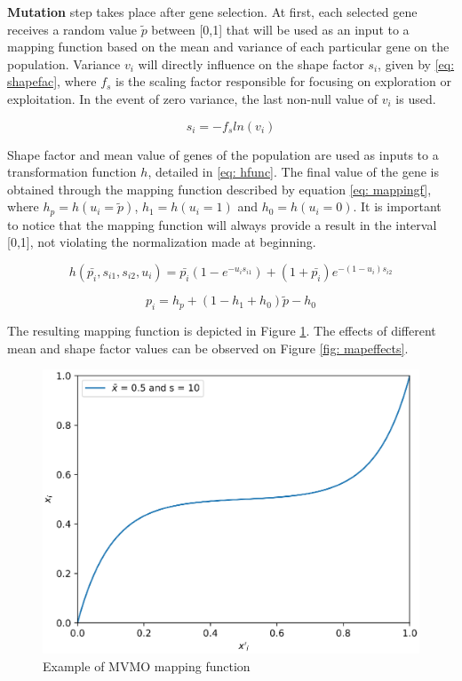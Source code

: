 \textbf{Mutation} step takes place after gene selection. At first, each selected gene receives a random value $\tilde{p}$ between [0,1] that will be used as an input to a mapping function based on the mean and variance of each particular gene on the population. Variance $v_{i}$ will directly influence on the shape factor $s_{i}$,  given by \eqref{eq: shapefac}, where $f_{s}$ is the scaling factor responsible for focusing on exploration or exploitation. In the event of zero variance, the last non-null value of $v_{i}$ is used.

\begin{equation}
	s_{i} = -f_{s}ln(v_{i})
	\label{eq: shapefac}
\end{equation}

Shape factor and mean value of genes of the population are used as inputs to a transformation function $h$, detailed in \eqref{eq: hfunc}. The final value of the gene is obtained through the mapping function described by equation \eqref{eq: mappingf}, where $h_{p} = h(u_{i} = \tilde{p})$, $h_{1} = h(u_{i} = 1)$ and $h_{0} = h(u_{i} = 0)$. It is important to notice that the mapping function will always provide a result in the interval [0,1], not violating the normalization made at beginning.

\begin{equation}
	h(\bar{p_{i}}, s_{i1}, s_{i2}, u_{i}) = \bar{p_{i}}(1 - e^{-u_{i}s_{i1}}) + (1 + \bar{p_{i}})e^{-(1 - u_{i})s_{i2}}
	\label{eq: hfunc}
\end{equation}

\begin{equation}
	p_{i} = h_{p} + (1 - h_{1} + h_{0})\tilde{p} - h_{0}
	\label{eq: mappingf}
\end{equation}

The resulting mapping function is depicted in Figure \ref{fig: mappingf}. The effects of different mean and shape factor values can be observed on Figure \ref{fig: mapeffects}.

\begin{figure}[!h]
	\caption{Example of MVMO mapping function}
	\begin{center}
		\includegraphics[scale=.5]{Images/MVMOTransformation.eps}
	\end{center}
	\label{fig: mappingf}
\end{figure}


